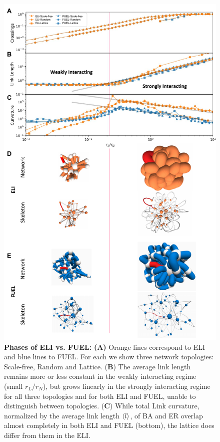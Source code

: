 %
\begin{figure}
\centering
\includegraphics[width=.69\columnwidth]{fig-09-19/3D-phase-compare-092617.pdf}
\caption{%
         \scriptsize {\bf Phases of ELI vs. FUEL:} {\bf (A)} 
         Orange lines correspond to ELI and blue lines to FUEL.
         For each we show three network topologies: Scale-free, Random and Lattice.
         ({\bf B}) The average link length remains more or less constant in the weakly interacting regime (small $r_L/r_N$), but grows linearly in the strongly interacting regime for all three topologies and for both ELI and FUEL, unable to distinguish between topologies.  
         ({\bf C}) While total Link curvature, normalized by the average link length $\left<l\right>$, of BA and ER overlap almost completely in both ELI and FUEL (bottom), the lattice does differ from them in the ELI.
}
\end{figure}
